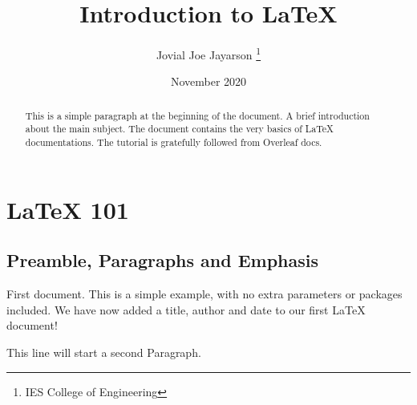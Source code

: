 \documentclass[12pt, a4paper]{report}
\title{Introduction to \LaTeX{}}
\author{Jovial Joe Jayarson \thanks{IES College of Engineering}}
\date{November 2020}
\begin{document}
\maketitle %

\begin{abstract}
    This is a simple paragraph at the beginning of the document. A brief introduction about the main subject. The document contains the very basics of \LaTeX{} documentations. The tutorial is gratefully followed from Overleaf docs.
\end{abstract}

\tableofcontents

\chapter{\LaTeX{} 101} %



\section{Preamble, Paragraphs and Emphasis}

First document. This is a simple example, with no extra parameters or packages included. We have now added a title, author and date to our first \LaTeX{} document!

This line will start a second Paragraph.
\end{document}
